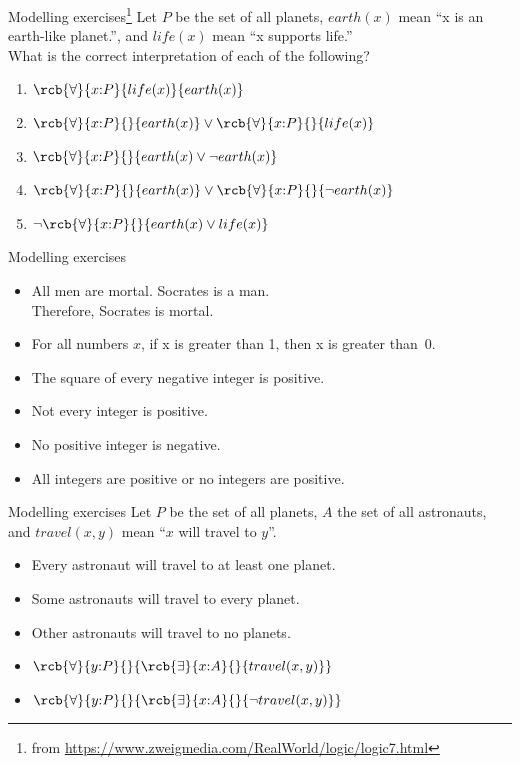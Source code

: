 \documentclass{beamer}
\def\false{\fuc{false}}
\begin{document}
\begin{slide}{Modelling exercises\footnote{from \url{https://www.zweigmedia.com/RealWorld/logic/logic7.html}}}
Let $P$ be the set of all planets, $earth(x)$ mean ``x is an earth-like planet.'', and 
$life(x)$ mean ``x supports life.''\\
What is the correct interpretation of each of the following?
\begin{enumerate}
  \item $\rcb{\forall}{x{:}P}{life(x)}{earth(x)}$
  \item $\rcb{\forall}{x{:}P}{}{earth(x)} \lor \rcb{\forall}{x{:}P}{}{life(x)}$
  \item $\rcb{\forall}{x{:}P}{}{earth(x) \lor \lnot earth(x)}$
  \item $\rcb{\forall}{x{:}P}{}{earth(x)} \lor \rcb{\forall}{x{:}P}{}{\lnot earth(x)}$
  \item $\lnot\rcb{\forall}{x{:}P}{}{earth(x) \lor life(x)}$
\end{enumerate}
\end{slide}

\begin{slide}{Modelling exercises}
\begin{itemize}
  \item All men are mortal. Socrates is a man.\\Therefore, Socrates is mortal.
  \item For all numbers $x$, if x is greater than 1, then x is greater than~0.
  \item The square of every negative integer is positive.
  \item Not every integer is positive.
  \item No positive integer is negative.
  \item All integers are positive or no integers are positive.
\end{itemize}
\end{slide}

\begin{slide}{Modelling exercises}
Let $P$ be the set of all planets, $A$ the set of all astronauts, and $travel(x,y)$ mean ``$x$ will travel to $y$''.\\
\begin{itemize}
  \item Every astronaut will travel to at least one planet.
  \item Some astronauts will travel to every planet.
  \item Other astronauts will travel to no planets.
  \item $\rcb{\forall}{y{:}P}{}{\rcb{\exists}{x{:}A}{}{travel(x,y)}}$
  \item $\rcb{\forall}{y{:}P}{}{\rcb{\exists}{x{:}A}{}{\lnot travel(x,y)}}$
\end{itemize}
\end{slide}
\end{document}
